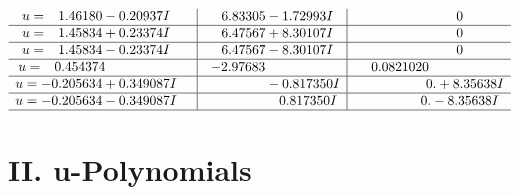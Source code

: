 \documentclass[1p]{elsarticle_modified}
\theoremstyle{definition}
\begin{document}
$$\begin{array}{c|c|c}
\begin{aligned}
u &= \phantom{-}1.46180 - 0.20937 I\end{aligned}
 & \phantom{-}6.83305 - 1.72993 I & \phantom{-0.000000 } 0 \\ \hline\begin{aligned}
u &= \phantom{-}1.45834 + 0.23374 I\end{aligned}
 & \phantom{-}6.47567 + 8.30107 I & \phantom{-0.000000 } 0 \\ \hline\begin{aligned}
u &= \phantom{-}1.45834 - 0.23374 I\end{aligned}
 & \phantom{-}6.47567 - 8.30107 I & \phantom{-0.000000 } 0 \\ \hline\begin{aligned}
u &= \phantom{-}0.454374\phantom{ +0.000000I}\end{aligned}
 & -2.97683\phantom{ +0.000000I} & \phantom{-}0.0821020\phantom{ +0.000000I} \\ \hline\begin{aligned}
u &= -0.205634 + 0.349087 I\end{aligned}
 & \phantom{-0.000000 } -0.817350 I & \phantom{-0.000000 -}0. + 8.35638 I \\ \hline\begin{aligned}
u &= -0.205634 - 0.349087 I\end{aligned}
 & \phantom{-0.000000 -}0.817350 I & \phantom{-0.000000 } 0. - 8.35638 I\\
 \hline 
 \end{array}$$\newpage
\newpage\renewcommand{\arraystretch}{1}
\centering \section*{ II. u-Polynomials}
\end{document}
